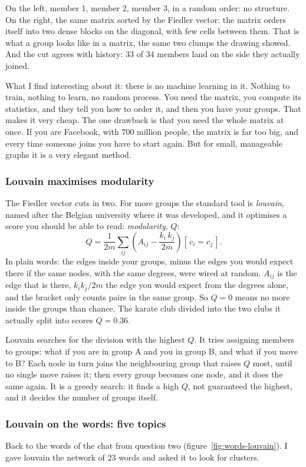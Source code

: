 \documentclass[12pt, a4paper]{article}
\theoremstyle{definition}
\theoremstyle{remark}
\begin{document}
On the left, member 1, member 2, member 3, in a random order: no structure. On the right, the same matrix sorted by the Fiedler vector: the matrix orders itself into two dense blocks on the diagonal, with few cells between them. That is what a group looks like in a matrix, the same two clumps the drawing showed. And the cut agrees with history: $33$ of $34$ members land on the side they actually joined.

What I find interesting about it: there is no machine learning in it. Nothing to train, nothing to learn, no random process. You need the matrix, you compute its statistics, and they tell you how to order it, and then you have your groups. That makes it very cheap. The one drawback is that you need the whole matrix at once. If you are Facebook, with $700$ million people, the matrix is far too big, and every time someone joins you have to start again. But for small, manageable graphs it is a very elegant method.

\subsubsection{Louvain maximises modularity}
The Fiedler vector cuts in two. For more groups the standard tool is \emph{louvain}, named after the Belgian university where it was developed, and it optimises a score you should be able to read: \emph{modularity}, $Q$:
\[
Q = \frac{1}{2m} \sum_{ij} \left( A_{ij} - \frac{k_i\, k_j}{2m} \right) [\,c_i = c_j\,].
\]
In plain words: the edges inside your groups, minus the edges you would expect there if the same nodes, with the same degrees, were wired at random. $A_{ij}$ is the edge that is there, $k_i k_j / 2m$ the edge you would expect from the degrees alone, and the bracket only counts pairs in the same group. So $Q = 0$ means no more inside the groups than chance. The karate club divided into the two clubs it actually split into scores $Q = 0.36$.

Louvain searches for the division with the highest $Q$. It tries assigning members to groups: what if you are in group A and you in group B, and what if you move to B? Each node in turn joins the neighbouring group that raises $Q$ most, until no single move raises it; then every group becomes one node, and it does the same again. It is a greedy search: it finds a high $Q$, not guaranteed the highest, and it decides the number of groups itself.

\subsubsection{Louvain on the words: five topics}
Back to the words of the chat from question two (figure~\ref{fig:words-louvain}). I gave louvain the network of $23$ words and asked it to look for clusters.
\end{document}
